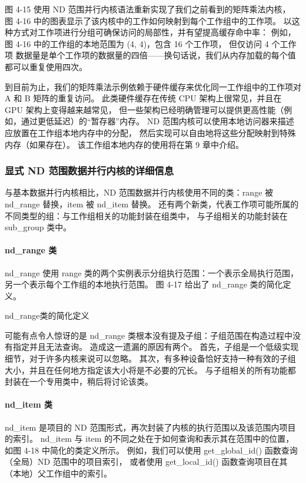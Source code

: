 图 4-15 使用 ND 范围并行内核语法重新实现了我们之前看到的矩阵乘法内核，
图 4-16 中的图表显示了该内核中的工作如何映射到每个工作组中的工作项。 
以这种方式对工作项进行分组可确保访问的局部性，并有望提高缓存命中率：
例如，图 4-16 中的工作组的本地范围为 (4, 4)，包含 16 个工作项，
但仅访问 4 个工作项 数据量是单个工作项的数据量的四倍——换句话说，我们从内存加载的每个值都可以重复使用四次。

到目前为止，我们的矩阵乘法示例依赖于硬件缓存来优化同一工作组中的工作项对 A 和 B 矩阵的重复访问。 
此类硬件缓存在传统 CPU 架构上很常见，并且在 GPU 架构上变得越来越常见，
但一些架构已经明确管理可以提供更高性能（例如，通过更低延迟）的“暂存器”内存。 
ND 范围内核可以使用本地访问器来描述应放置在工作组本地内存中的分配，
然后实现可以自由地将这些分配映射到特殊内存（如果存在）。 该工作组本地内存的使用将在第 9 章中介绍。

\subsubsection{显式 ND 范围数据并行内核的详细信息}
与基本数据并行内核相比，ND 范围数据并行内核使用不同的类：range 被 nd\_range 替换，item 被 nd\_item 替换。 
还有两个新类，代表工作项可能所属的不同类型的组：与工作组相关的功能封装在组类中，
与子组相关的功能封装在 sub\_group 类中。

\paragraph{nd\_range 类}

nd\_range 使用 range 类的两个实例表示分组执行范围：一个表示全局执行范围，另一个表示每个工作组的本地执行范围。 
图 4-17 给出了 nd\_range 类的简化定义。

{\color{red} nd\_range类的简化定义}

可能有点令人惊讶的是 nd\_range 类根本没有提及子组：子组范围在构造过程中没有指定并且无法查询。 
造成这一遗漏的原因有两个。 首先，子组是一个低级实现细节，对于许多内核来说可以忽略。 
其次，有多种设备恰好支持一种有效的子组大小，并且在任何地方指定该大小将是不必要的冗长。 
与子组相关的所有功能都封装在一个专用类中，稍后将讨论该类。

\paragraph{nd\_item 类}

nd\_item 是项目的 ND 范围形式，再次封装了内核的执行范围以及该范围内项目的索引。 
nd\_item 与 item 的不同之处在于如何查询和表示其在范围中的位置，如图 4-18 中简化的类定义所示。 
例如，我们可以使用 get\_global\_id() 函数查询（全局）ND 范围中的项目索引，
或者使用 get\_local\_id() 函数查询项目在其（本地）父工作组中的索引。

